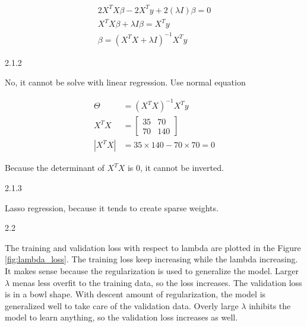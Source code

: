 \documentclass[11pt]{article}
\begin{document}
\begin{enumerate}
$$\begin{aligned}
2X^TX\beta - 2X^Ty + 2(\lambda I)\beta = 0 \\
X^TX\beta + \lambda I\beta = X^Ty \\
\beta = (X^TX + \lambda I)^{-1} X^Ty
\end{aligned}$$

\medskip

2.1.2

No, it cannot be solve with linear regression. Use normal equation

$$\begin{aligned}
\Theta &= (X^TX)^{-1}X^Ty \\
X^TX &= \begin{bmatrix}
  35 & 70 \\
  70 & 140
\end{bmatrix} \\
|X^TX| &= 35 \times 140 - 70 \times 70 = 0
\end{aligned}$$

Because the determinant of $X^TX$ is $0$, it cannot be inverted.

2.1.3

Lasso regression, because it tends to create sparse weights.

\medskip

2.2

The training and validation loss with respect to lambda are plotted in the Figure \ref{fig:lambda_loss}. The training loss keep increasing while the lambda increasing. It makes sense because the regularization is used to generalize the model. Larger $\lambda$ menas less overfit to the training data, so the loss increases. The validation loss is in a bowl shape. With descent amount of regularization, the model is generalized well to take care of the validation data. Overly large $\lambda$ inhibits the model to learn anything, so the validation loss increases as well.


\end{enumerate}
\end{document}
